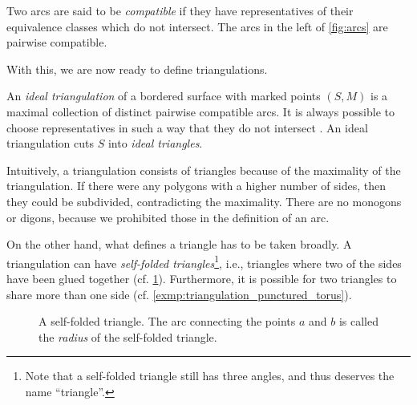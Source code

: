 \begin{definition}

	Two arcs are said to be \emph{compatible} if they have
	representatives of their equivalence classes which do not intersect. The arcs in the
	left of \cref{fig:arcs} are pairwise compatible.
\end{definition}

With this, we are now ready to define triangulations.

\begin{definition}

	An \emph{ideal triangulation} of a bordered surface with
	marked points $(S, M)$ is a maximal collection of distinct pairwise compatible arcs. It
	is always possible to choose representatives in such a way that they do not intersect \parencite[Proposition 2.5]{FominShapiroThurston2008CATriangulatedSurfacesI}. An ideal
	triangulation cuts $S$ into \emph{ideal triangles}.
\end{definition}

Intuitively, a triangulation consists of triangles because of the maximality of the
triangulation. If there were any polygons with a higher number of sides, then they
could be subdivided, contradicting the maximality. There are no monogons or digons,
because we prohibited those in the definition of an arc.

On the other hand, what defines a triangle has to be taken broadly. A triangulation can
have \emph{self-folded triangles}\footnote{Note that a
	self-folded triangle still has three angles, and thus deserves the name ``triangle''.},
i.e., triangles where two of the sides have been glued together (cf.
\cref{fig:self_folded}). Furthermore, it is possible for two triangles to share more
than one side (cf. \cref{exmp:triangulation_punctured_torus}).
\begin{figure}[ht!]
	\centering


	\caption{A self-folded triangle. The arc connecting the points $a$ and $b$ is called the \emph{radius} of the self-folded triangle.}
	\label{fig:self_folded}
\end{figure}

